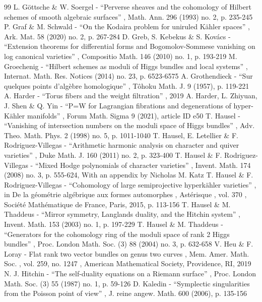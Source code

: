 \documentclass[11pt]{article}
\theoremstyle{definition}
\begin{document}
\begin{thebibliography}{99}
 L. Göttsche \& W. Soergel - “Perverse sheaves and the cohomology of Hilbert schemes of smooth algebraic surfaces” , Math. Ann. 296 (1993) no. 2, p. 235-245
 P. Graf \& M. Schwald - “On the Kodaira problem for uniruled Kähler spaces” , Ark. Mat. 58 (2020) no. 2, p. 267-284
 D. Greb, S. Kebekus \& S. Kovács - “Extension theorems for differential forms and Bogomolov-Sommese vanishing on log canonical varieties” , Compositio Math. 146 (2010) no. 1, p. 193-219
 M. Groechenig - “Hilbert schemes as moduli of Higgs bundles and local systems” , Internat. Math. Res. Notices (2014) no. 23, p. 6523-6575
 A. Grothendieck - “Sur quelques points d’algèbre homologique” , Tôhoku Math. J. 9 (1957), p. 119-221
 A. Harder - “Torus fibers and the weight filtration” , 2019
 A. Harder, L. Zhiyuan, J. Shen \& Q. Yin - “P=W for Lagrangian fibrations and degenerations of hyper-Kähler manifolds” , Forum Math. Sigma 9 (2021), article ID e50
 T. Hausel - “Vanishing of intersection numbers on the moduli space of Higgs bundles” , Adv. Theo. Math. Phys. 2 (1998) no. 5, p. 1011-1040
 T. Hausel, E. Letellier \& F. Rodriguez-Villegas - “Arithmetic harmonic analysis on character and quiver varieties” , Duke Math. J. 160 (2011) no. 2, p. 323-400
 T. Hausel \& F. Rodriguez-Villegas - “Mixed Hodge polynomials of character varieties” , Invent. Math. 174 (2008) no. 3, p. 555-624, With an appendix by Nicholas M. Katz
 T. Hausel \& F. Rodriguez-Villegas - “Cohomology of large semiprojective hyperkähler varieties” , in De la géométrie algébrique aux formes automorphes , Astérisque , vol. 370 , Société Mathématique de France, Paris, 2015, p. 113-156
 T. Hausel \& M. Thaddeus - “Mirror symmetry, Langlands duality, and the Hitchin system” , Invent. Math. 153 (2003) no. 1, p. 197-229
 T. Hausel \& M. Thaddeus - “Generators for the cohomology ring of the moduli space of rank 2 Higgs bundles” , Proc. London Math. Soc. (3) 88 (2004) no. 3, p. 632-658
 V. Heu \& F. Loray - Flat rank two vector bundles on genus two curves , Mem. Amer. Math. Soc. , vol. 259, no. 1247 , American Mathematical Society, Providence, RI, 2019
 N. J. Hitchin - “The self-duality equations on a Riemann surface” , Proc. London Math. Soc. (3) 55 (1987) no. 1, p. 59-126
 D. Kaledin - “Symplectic singularities from the Poisson point of view” , J. reine angew. Math. 600 (2006), p. 135-156

\end{thebibliography}
\end{document}
